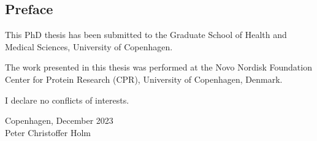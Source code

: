 \begin{@empty}
\thispagestyle{empty}
\setlength{\parindent}{0pt}
\setlength{\parskip}{\baselineskip}

\chapter*{Preface}

This PhD thesis has been submitted
to the Graduate School of Health and Medical Sciences,
University of Copenhagen.

The work presented in this thesis was performed
at the Novo Nordisk Foundation Center for Protein Research (CPR),
University of Copenhagen, Denmark.

I declare no conflicts of interests.

\begin{flushright}
    Copenhagen, December 2023 \\
    Peter Christoffer Holm
\end{flushright}
\end{@empty}
